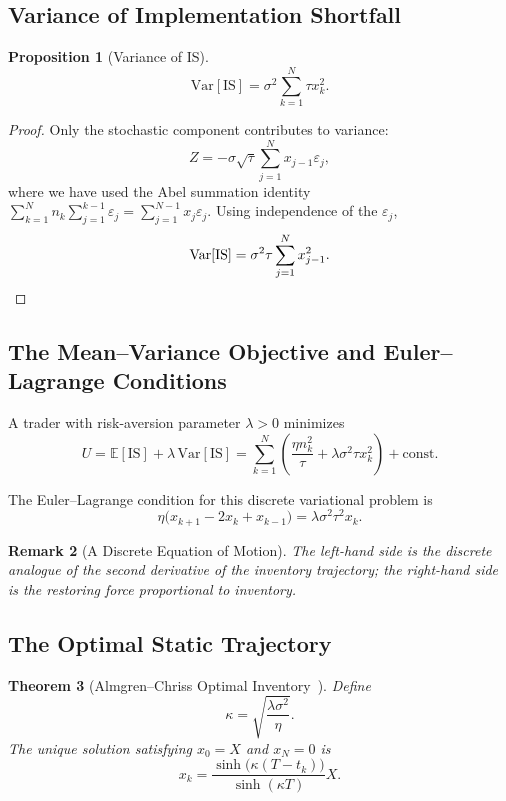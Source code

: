 \documentclass[11pt]{article}
\newtheorem{theorem}{Theorem}[section]
\newtheorem{proposition}[theorem]{Proposition}
\newtheorem{remark}[theorem]{Remark}
\begin{document}
\subsection{Variance of Implementation Shortfall}

\begin{proposition}[Variance of IS]
\[
\mathrm{Var}[\mathrm{IS}] = \sigma^2 \sum_{k=1}^{N} \tau x_k^2.
\]
\end{proposition}

\begin{proof}
Only the stochastic component contributes to variance:
\[
Z = -\sigma\sqrt{\tau}\sum_{j=1}^N x_{j-1}\varepsilon_j,
\]
where we have used the Abel summation identity
$\sum_{k=1}^N n_k \sum_{j=1}^{k-1}\varepsilon_j = \sum_{j=1}^{N-1} x_j \varepsilon_j$.
Using independence of the $\varepsilon_j$,
\[
\mathrm{Var}[\mathrm{IS}] = \sigma^2\tau\sum_{j=1}^N x_{j-1}^2. \qedhere
\]
\end{proof}

\subsection{The Mean--Variance Objective and Euler--Lagrange Conditions}

A trader with risk-aversion parameter $\lambda > 0$ minimizes
\[
U = \mathbb{E}[\text{IS}] + \lambda\,\mathrm{Var}[\text{IS}]
= \sum_{k=1}^N\left(\frac{\eta n_k^2}{\tau} + \lambda\sigma^2\tau x_k^2\right) + \text{const}.
\]

The Euler--Lagrange condition for this discrete variational problem is
\[
\eta\bigl(x_{k+1} - 2x_k + x_{k-1}\bigr)
= \lambda\sigma^2\tau^2 x_k.
\]

\begin{remark}[A Discrete Equation of Motion]
The left-hand side is the discrete analogue of the second derivative of the inventory trajectory;
the right-hand side is the restoring force proportional to inventory.
\end{remark}

\subsection{The Optimal Static Trajectory}

\begin{theorem}[Almgren--Chriss Optimal Inventory~\cite{almgren2001optimal}]
Define
\[
\kappa = \sqrt{\frac{\lambda\sigma^2}{\eta}}.
\]
The unique solution satisfying $x_0 = X$ and $x_N = 0$ is
\[
\boxed{
 x_k = \frac{\sinh\bigl(\kappa(T-t_k)\bigr)}{\sinh(\kappa T)}X
}.
\]
\end{theorem}
\end{document}
